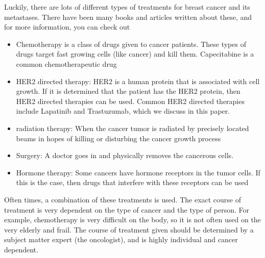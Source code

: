Luckily, there are lots of different types of treatments for breast cancer and its metastases. There have been many books and articles written about these, and for more information, you can check out 
\begin{comment}
(http://www.cancer.gov/types/breast/patient/breast-treatment-pdq)
\end{comment}
\begin{itemize}
\item Chemotherapy is a class of drugs given to cancer patients. These types of drugs target fast growing cells (like cancer) and kill them. Capecitabine is a common chemotherapeutic drug
\item HER2 directed therapy: HER2 is a human protein that is associated with cell growth. If it is determined that the patient has the HER2 protein, then HER2 directed therapies can be used. Common HER2 directed therapies include Lapatinib and Trastuzumab, which we discuss in this paper.
\item radiation therapy: When the cancer tumor is radiated by precisely located beams in hopes of killing or disturbing the cancer growth process
\item Surgery: A doctor goes in and physically removes the cancerous cells.
\item Hormone therapy: Some cancers have hormone receptors in the tumor cells. If this is the case, then drugs that interfere with these receptors can be used
\end{itemize}
Often times, a combination of these treatments is used. The exact course of treatment is very dependent on the type of cancer and the type of person. For example, chemotherapy is very difficult on the body, so it is not often used on the very elderly and frail. The course of treatment given should be determined by a subject matter expert (the oncologist), and is highly individual and cancer dependent.
